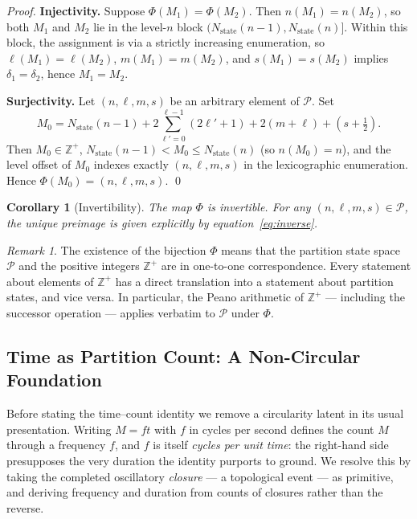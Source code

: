 \documentclass[twocolumn,10pt,a4paper]{article}
\theoremstyle{thmstyle}
\newtheorem{corollary}[theorem]{Corollary}
\theoremstyle{definition}
\theoremstyle{remark}
\newtheorem{remark}[theorem]{Remark}
\newcommand{\Zp}{\mathbb{Z}^{+}}
\newcommand{\Parts}{\mathcal{P}}
\newcommand{\Nstate}{N_{\mathrm{state}}}
\newcommand{\PhiMap}{\varPhi}
\begin{document}
\begin{proof}
\textbf{Injectivity.} Suppose $\PhiMap(M_1) = \PhiMap(M_2)$. Then $n(M_1) = n(M_2)$, so both $M_1$ and $M_2$ lie in the level-$n$ block $(\Nstate(n-1), \Nstate(n)]$. Within this block, the assignment is via a strictly increasing enumeration, so $\ell(M_1) = \ell(M_2)$, $m(M_1) = m(M_2)$, and $s(M_1) = s(M_2)$ implies $\delta_1 = \delta_2$, hence $M_1 = M_2$.

\textbf{Surjectivity.} Let $(n, \ell, m, s)$ be an arbitrary element of $\Parts$. Set
\begin{equation}
    M_0 = \Nstate(n-1) + 2\sum_{\ell'=0}^{\ell-1}(2\ell'+1) + 2(m + \ell) + \left(s + \tfrac{1}{2}\right).
    \label{eq:inverse}
\end{equation}
Then $M_0 \in \Zp$, $\Nstate(n-1) < M_0 \leq \Nstate(n)$ (so $n(M_0) = n$), and the level offset of $M_0$ indexes exactly $(n, \ell, m, s)$ in the lexicographic enumeration. Hence $\PhiMap(M_0) = (n, \ell, m, s)$. \qed
\end{proof}

\begin{corollary}[Invertibility]
\label{cor:inverse}
The map $\PhiMap$ is invertible. For any $(n, \ell, m, s) \in \Parts$, the unique preimage is given explicitly by equation~\eqref{eq:inverse}.
\end{corollary}

\begin{remark}
The existence of the bijection $\PhiMap$ means that the partition state space $\Parts$ and the positive integers $\Zp$ are in one-to-one correspondence. Every statement about elements of $\Zp$ has a direct translation into a statement about partition states, and vice versa. In particular, the Peano arithmetic of $\Zp$ --- including the successor operation --- applies verbatim to $\Parts$ under $\PhiMap$.
\end{remark}

\subsection{Time as Partition Count: A Non-Circular Foundation}
\label{sec:noncircular}

Before stating the time--count identity we remove a circularity latent in its
usual presentation. Writing $M = ft$ with $f$ in cycles per second defines the
count $M$ through a frequency $f$, and $f$ is itself \emph{cycles per unit
time}: the right-hand side presupposes the very duration the identity purports
to ground. We resolve this by taking the completed oscillatory \emph{closure}
--- a topological event --- as primitive, and deriving frequency and duration
from counts of closures rather than the reverse.
\end{document}
